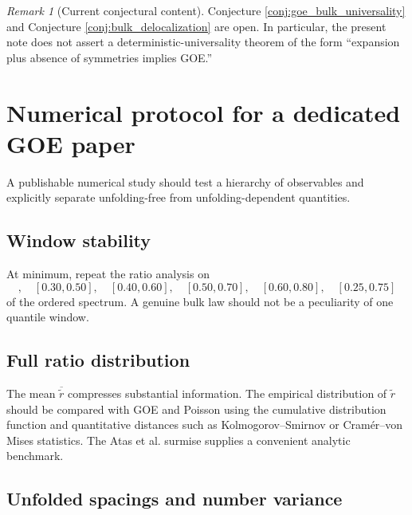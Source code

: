 \documentclass[11pt]{amsart}
\numberwithin{equation}{section}
\theoremstyle{plain}
\theoremstyle{definition}
\theoremstyle{remark}
\newtheorem{remark}[theorem]{Remark}
\begin{document}
\begin{remark}[Current conjectural content]
\label{rem:current_conjectural_content}
Conjecture \ref{conj:goe_bulk_universality} and Conjecture \ref{conj:bulk_delocalization} are open.  In particular, the present note does not assert a deterministic-universality theorem of the form ``expansion plus absence of symmetries implies GOE.''
\end{remark}

\section{Numerical protocol for a dedicated GOE paper}
\label{sec:numerical_protocol}

A publishable numerical study should test a hierarchy of observables and explicitly separate unfolding-free from unfolding-dependent quantities.

\subsection{Window stability}
\label{subsec:window_stability}

At minimum, repeat the ratio analysis on
\begin{equation}
[0.20,0.40],\quad
[0.30,0.50],\quad
[0.40,0.60],\quad
[0.50,0.70],\quad
[0.60,0.80],\quad
[0.25,0.75]
\label{eq:recommended_windows}
\end{equation}
of the ordered spectrum.  A genuine bulk law should not be a peculiarity of one quantile window.

\subsection{Full ratio distribution}
\label{subsec:full_ratio_distribution}

The mean $\overline{\widetilde r}$ compresses substantial information.  The empirical distribution of $\widetilde r$ should be compared with GOE and Poisson using the cumulative distribution function and quantitative distances such as Kolmogorov--Smirnov or Cram\'er--von Mises statistics.  The Atas et al. surmise \cite{Atas2013} supplies a convenient analytic benchmark.

\subsection{Unfolded spacings and number variance}
\label{subsec:spacing_number_protocol}
\end{document}
